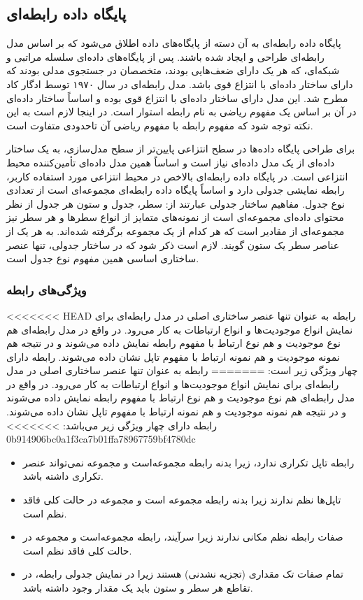 {{\subsection{پایگاه داده رابطه‌ای}
پایگاه داده رابطه‌ای به آن دسته از پایگاه‌های داده اطلاق می‌شود که بر اساس مدل رابطه‌ای طراحی و ایجاد شده باشند. پس از پایگاه‌های داده‌ای سلسله مراتبی و شبکه‌ای، که هر یک دارای ضعف‌هایی بودند، متخصصان در جستجوی مدلی بودند که دارای ساختار داده‌ای با انتزاع قوی باشد. مدل رابطه‌ای در سال ۱۹۷۰ توسط ادگار کاد مطرح شد. این مدل دارای ساختار داده‌ای با انتزاع قوی بوده و اساساً ساختار داده‌ای در آن بر اساس یک مفهوم ریاضی به نام رابطه استوار است. در اینجا لازم است به این نکته توجه شود که مفهوم رابطه با مفهوم ریاضی آن تاحدودی متفاوت است.
 
برای طراحی پایگاه داده‌ها در سطح انتزاعی پایین‌تر از سطح مدل‌سازی، به یک ساختار داده‌ای از یک مدل داده‌ای نیاز است و اساساً همین مدل داده‌ای تأمین‌کننده محیط انتزاعی است. در پایگاه داده رابطه‌ای بالاخص در محیط انتزاعی مورد استفاده کاربر، رابطه نمایشی جدولی دارد و اساساً پایگاه داده رابطه‌ای مجموعه‌ای است از تعدادی نوع جدول. مفاهیم ساختار جدولی عبارتند از: سطر، جدول و ستون
هر جدول از نظر محتوای داده‌ای مجموعه‌ای است از نمونه‌های متمایز از انواع سطرها و هر سطر نیز مجموعه‌ای از مقادیر است که هر کدام از یک مجموعه برگرفته شده‌اند. به هر یک از عناصر سطر یک ستون گویند. لازم است ذکر شود که در ساختار جدولی، تنها عنصر ساختاری اساسی همین مفهوم نوع جدول است.
 
\subsubsection{ویژگی‌های رابطه}
<<<<<<< HEAD
رابطه به عنوان تنها عنصر ساختاری اصلی در مدل رابطه‌ای برای نمایش انواع موجودیت‌ها و انواع ارتباطات به کار می‌رود. در واقع در مدل رابطه‌ای هم نوع موجودیت و هم نوع ارتباط با مفهوم رابطه نمایش داده می‌شوند و در نتیجه هم نمونه موجودیت و هم نمونه ارتباط با مفهوم تاپل نشان داده می‌شوند. رابطه دارای چهار ویژگی زیر است:
=======
رابطه به عنوان تنها عنصر ساختاری اصلی در مدل رابطه‌ای برای نمایش انواع موجودیت‌ها و انواع ارتباطات به کار می‌رود. در واقع در مدل رابطه‌ای هم نوع موجودیت و هم نوع ارتباط با مفهوم رابطه نمایش داده می‌شوند و در نتیجه هم نمونه موجودیت و هم نمونه ارتباط با مفهوم تاپل نشان داده می‌شوند. رابطه دارای چهار ویژگی زیر می‌باشد:
>>>>>>> 0b914906bc0a1f3ca7b01ffa78967759bf4780dc
\begin{itemize}
  	\item رابطه تاپل تکراری ندارد، زیرا بدنه رابطه مجموعه‌است و مجموعه نمی‌تواند عنصر تکراری داشته باشد.
	\item تاپل‌ها نظم ندارند زیرا بدنه رابطه مجموعه‌ است و مجموعه در حالت کلی فاقد نظم است.
	\item صفات رابطه نظم مکانی ندارند زیرا سرآیند، رابطه مجموعه‌است و مجموعه در حالت کلی فاقد نظم است.
	\item تمام صفات تک مقداری (تجزیه نشدنی) هستند زیرا در نمایش جدولی رابطه، در تقاطع هر سطر و ستون باید یک مقدار وجود داشته باشد.
\end{itemize}

}}
